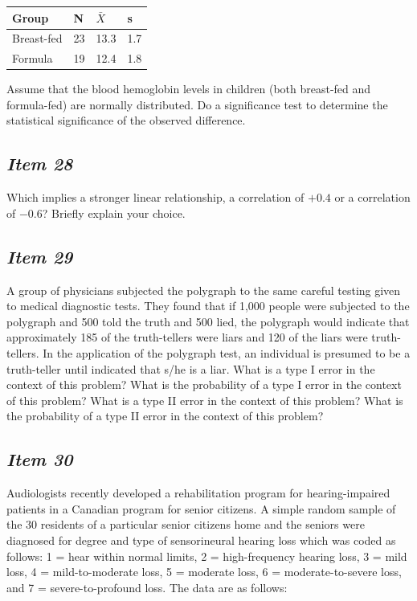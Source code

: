 \documentclass[twoside,openany]{tufte-book}
\begin{document}
\begin{table}[!ht]
\begin{center}
\begin{tabular}{llll}
\hline
Group & N & $\bar{X}$ & s\\
\hline
Breast-fed	 & 23 & 13.3 & 1.7\\
Formula & 19 & 12.4 & 1.8\\
\hline
\end{tabular}
\end{center}
\end{table}

Assume that the blood hemoglobin levels in children (both breast-fed and formula-fed) are normally distributed.  Do a significance test to determine the statistical significance of the observed difference.

\subsection{\textbf{\textit{Item 28}}}
Which implies a stronger linear relationship, a correlation of $+0.4$ or a correlation of $-0.6$?  Briefly explain your choice.

\subsection{\textbf{\textit{Item 29}}}
A group of physicians subjected the polygraph to the same careful testing given to medical diagnostic tests.  They found that if 1,000 people were subjected to the polygraph and 500 told the truth and 500 lied, the polygraph would indicate that approximately 185 of the truth-tellers were liars and 120 of the liars were truth-tellers.  In the application of the polygraph test, an individual is presumed to be a truth-teller until indicated that s/he is a liar. What is a type I error in the context of this problem?  What is the probability of a type I error in the context of this problem?  What is a type II error in the context of this problem?  What is the probability of a type II error in the context of this problem?

\newpage

\subsection{\textbf{\textit{Item 30}}}
Audiologists recently developed a rehabilitation program for hearing-impaired patients in a Canadian program for senior citizens.  A simple random sample of the 30 residents of a particular senior citizens home and the seniors were diagnosed for degree and type of sensorineural hearing loss which was coded as follows: 1 = hear within normal limits, 2 = high-frequency hearing loss, 3 = mild loss, 4 = mild-to-moderate loss, 5 = moderate loss, 6 = moderate-to-severe loss, and 7 = severe-to-profound loss.  The data are as follows: 
\end{document}
